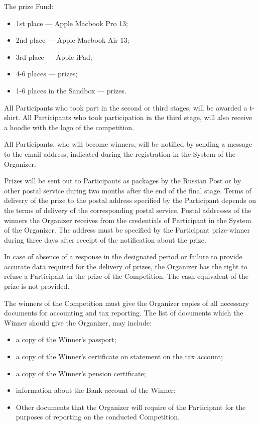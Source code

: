 The prize Fund:
\begin{itemize}
\item 1st place --- Apple Macbook Pro 13\textquotedbl;
\item 2nd place --- Apple Macbook Air 13\textquotedbl;
\item 3rd place --- Apple iPad;
\item 4-6 places --- prizes;
\item 1-6 places in the Sandbox --- prizes.
\end{itemize}

All Participants who took part in the second or third stages, will be awarded a t-shirt. All Participants 
who took participation in the third stage, will also receive a hoodie with the logo of the competition.

All Participants, who will become winners, will be notified by sending a message to the email address,
indicated during the registration in the System of the Organizer.

Prizes will be sent out to Participants as packages by the Russian Post or by other postal service during two months after the end 
of the final stage. Terms of delivery of the prize to the postal address specified by the Participant depends on the terms of
delivery of the corresponding postal service. Postal addresses of the winners the Organizer receives from the credentials of Participant
in the System of the Organizer. The address must be specified by the Participant prize-winner during
three days after receipt of the notification about the prize.

In case of absence of a response in the designated period or failure to provide accurate data required for the delivery of prizes, the Organizer
has the right to refuse a Participant in the prize of the Competition. The cash equivalent of the prize is not provided.
 
The winners of the Competition must give the Organizer copies of all necessary documents for accounting and tax reporting. 
The list of documents which the Winner should give the Organizer, may include:
\begin{itemize}
\item a copy of the Winner’s passport;
\item a copy of the Winner’s certificate on statement on the tax account;
\item a copy of the Winner’s pension certificate;
\item information about the Bank account of the Winner;
\item Other documents that the Organizer will require of the Participant for the purposes of reporting on the conducted Competition.
\end{itemize}

